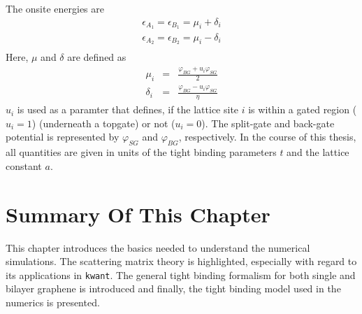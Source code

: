 The onsite energies are
\begin{eqnarray}
\epsilon_{A_1} = \epsilon_{B_1} = \mu_i + \delta_i \\
\epsilon_{A_2} = \epsilon_{B_2} = \mu_i - \delta_i \\
\end{eqnarray}
Here, $\mu$ and $\delta$ are defined as 
\begin{eqnarray}
\mu_i &=& \frac{\varphi_{BG} + u_i \varphi_{SG}}{2} \\
\delta_i &=& \frac{\varphi_{BG} -  u_i \varphi_{SG}}{\eta}
\end{eqnarray}
$u_i$ is used as a paramter that defines, if the lattice site $i$ is within a gated region ($u_i = 1$) (underneath a topgate) or not ($u_i = 0$). The split-gate and back-gate potential is represented by  $\varphi_{SG}$ and $ \varphi_{BG}$, respectively. In the course of this thesis, all quantities are given in units of the tight binding parameters $t$ and the lattice constant $a$.

\section{Summary Of This Chapter}
This chapter introduces the basics needed to understand the numerical simulations. The scattering matrix theory is highlighted, especially with regard to its applications in \texttt{kwant}. The general tight binding formalism for both single and bilayer graphene is introduced and finally, the tight binding model used in the numerics is presented.